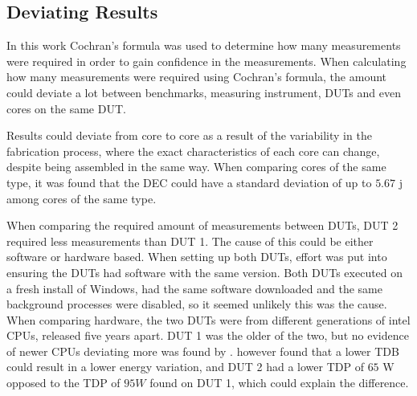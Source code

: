 \subsection{Deviating Results}

In this work Cochran's formula was used to determine how many measurements were required in order to gain confidence in the measurements. When calculating how many measurements were required using Cochran's formula, the amount could deviate a lot between benchmarks, measuring instrument, DUTs and even cores on the same DUT.

Results could deviate from core to core as a result of the variability in the fabrication process, where the exact characteristics of each core can change, despite being assembled in the same way.\cite{Mauzy2020} When comparing cores of the same type, it was found that the DEC could have a standard deviation of up to $5.67$ j among cores of the same type.


When comparing the required amount of measurements between DUTs, DUT 2 required less measurements than DUT 1. The cause of this could be either software or hardware based. When setting up both DUTs, effort was put into ensuring the DUTs had software with the same version. Both DUTs executed on a fresh install of Windows, had the same software downloaded and the same background processes were disabled, so it seemed unlikely this was the cause. When comparing hardware, the two DUTs were from different generations of intel CPUs, released five years apart. DUT 1 was the older of the two, but no evidence of newer CPUs deviating more was found by \cite{Ournani2020}. \cite{Ournani2020} however found that a lower TDB could result in a lower energy variation, and DUT 2 had a lower TDP of $65$ W opposed to the TDP of $95W$ found on DUT 1, which could explain the difference\cite{IntelComparison}.





